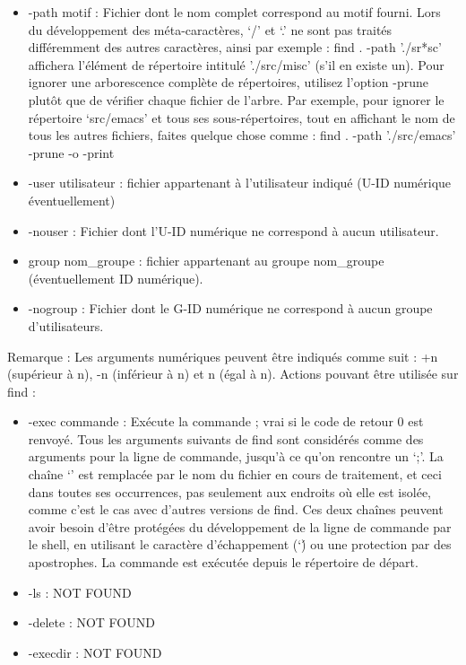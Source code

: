 \documentclass{article}[12pt]
\begin{document}
\begin{itemize}
\item -path motif : Fichier dont le nom complet correspond au motif fourni. Lors du développement des méta-caractères, `/' et `.' ne sont pas traités différemment des autres caractères, ainsi par exemple : 
find . -path './sr*sc' 
affichera l'élément de répertoire intitulé './src/misc' (s'il en existe un). Pour ignorer une arborescence complète de répertoires, utilisez l'option -prune plutôt que de vérifier chaque fichier de l'arbre. Par exemple, pour ignorer le répertoire `src/emacs' et tous ses sous-répertoires, tout en affichant le nom de tous les autres fichiers, faites quelque chose comme : 
find . -path './src/emacs' -prune -o -print
\item -user utilisateur : fichier appartenant à l'utilisateur indiqué (U-ID numérique éventuellement)
\item -nouser : Fichier dont l'U-ID numérique ne correspond à aucun utilisateur.
\item group nom\_groupe : fichier appartenant au groupe nom\_groupe (éventuellement ID numérique).
\item -nogroup : Fichier dont le G-ID numérique ne correspond à aucun groupe d'utilisateurs.
\end{itemize}
Remarque : Les arguments numériques peuvent être indiqués comme suit : +n (supérieur à n), -n (inférieur à n) et n (égal à n).
Actions pouvant être utilisée sur find : 
\begin{itemize}
\item -exec commande : Exécute la commande ; vrai si le code de retour 0 est renvoyé. Tous les arguments suivants de find sont considérés comme des arguments pour la ligne de commande, jusqu'à ce qu'on rencontre un `;'. La chaîne `{}' est remplacée par le nom du fichier en cours de traitement, et ceci dans toutes ses occurrences, pas seulement aux endroits où elle est isolée, comme c'est le cas avec d'autres versions de find. Ces deux chaînes peuvent avoir besoin d'être protégées du développement de la ligne de commande par le shell, en utilisant le caractère d'échappement (`\') ou une protection par des apostrophes. La commande est exécutée depuis le répertoire de départ.
\item -ls : NOT FOUND
\item -delete : NOT FOUND
\item -execdir : NOT FOUND
\end{itemize}
\end{document}
